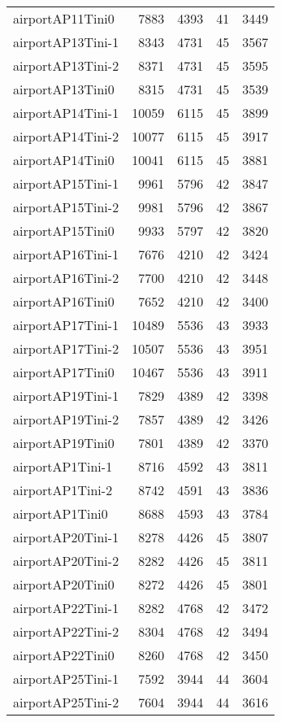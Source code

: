 \begin{longtable}{lrrrr}
airportAP11Tini0 & 7883 & 4393 & 41 & 3449 \\
airportAP13Tini-1 & 8343 & 4731 & 45 & 3567 \\
airportAP13Tini-2 & 8371 & 4731 & 45 & 3595 \\
airportAP13Tini0 & 8315 & 4731 & 45 & 3539 \\
airportAP14Tini-1 & 10059 & 6115 & 45 & 3899 \\
airportAP14Tini-2 & 10077 & 6115 & 45 & 3917 \\
airportAP14Tini0 & 10041 & 6115 & 45 & 3881 \\
airportAP15Tini-1 & 9961 & 5796 & 42 & 3847 \\
airportAP15Tini-2 & 9981 & 5796 & 42 & 3867 \\
airportAP15Tini0 & 9933 & 5797 & 42 & 3820 \\
airportAP16Tini-1 & 7676 & 4210 & 42 & 3424 \\
airportAP16Tini-2 & 7700 & 4210 & 42 & 3448 \\
airportAP16Tini0 & 7652 & 4210 & 42 & 3400 \\
airportAP17Tini-1 & 10489 & 5536 & 43 & 3933 \\
airportAP17Tini-2 & 10507 & 5536 & 43 & 3951 \\
airportAP17Tini0 & 10467 & 5536 & 43 & 3911 \\
airportAP19Tini-1 & 7829 & 4389 & 42 & 3398 \\
airportAP19Tini-2 & 7857 & 4389 & 42 & 3426 \\
airportAP19Tini0 & 7801 & 4389 & 42 & 3370 \\
airportAP1Tini-1 & 8716 & 4592 & 43 & 3811 \\
airportAP1Tini-2 & 8742 & 4591 & 43 & 3836 \\
airportAP1Tini0 & 8688 & 4593 & 43 & 3784 \\
airportAP20Tini-1 & 8278 & 4426 & 45 & 3807 \\
airportAP20Tini-2 & 8282 & 4426 & 45 & 3811 \\
airportAP20Tini0 & 8272 & 4426 & 45 & 3801 \\
airportAP22Tini-1 & 8282 & 4768 & 42 & 3472 \\
airportAP22Tini-2 & 8304 & 4768 & 42 & 3494 \\
airportAP22Tini0 & 8260 & 4768 & 42 & 3450 \\
airportAP25Tini-1 & 7592 & 3944 & 44 & 3604 \\
airportAP25Tini-2 & 7604 & 3944 & 44 & 3616 \\

\end{longtable}
